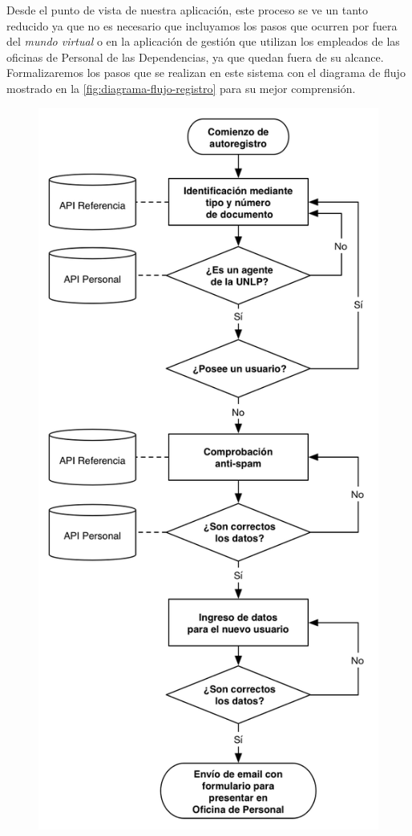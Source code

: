 Desde el punto de vista de nuestra aplicación, este proceso se ve un tanto reducido ya que no es necesario que incluyamos los pasos que ocurren por fuera del \textit{mundo virtual} o en la aplicación de gestión que utilizan los empleados de las oficinas de Personal de las Dependencias, ya que quedan fuera de su alcance. Formalizaremos los pasos que se realizan en este sistema con el diagrama de flujo  mostrado en la \autoref{fig:diagrama-flujo-registro} para su mejor comprensión.

\begin{figure}[H]
  \centering
  \includegraphics[width=\textwidth,height=0.95\textheight,keepaspectratio]{src/images/05-capitulo-5/flujo-registro.png}

\end{figure}
